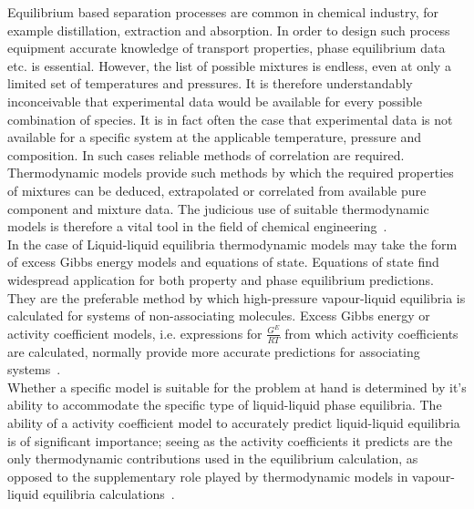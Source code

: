
Equilibrium based separation processes are common in chemical industry, for example distillation, extraction and absorption. In order to design such process equipment accurate knowledge of transport properties, phase equilibrium data etc. is essential. However, the list of possible mixtures is endless, even at only a limited set of temperatures and pressures. It is therefore understandably inconceivable that experimental data would be available for every possible combination of species. It is in fact often the case that experimental data is not available for a specific system at the applicable temperature, pressure and composition. In such cases reliable methods of correlation are required. Thermodynamic models provide such methods by which the required properties of mixtures can be deduced, extrapolated or correlated from available pure component and mixture data. The judicious use of suitable thermodynamic models is therefore a vital tool in the field of chemical engineering~\cite{SmithNessAbbott, GasLiquidProperties, ThermophysicalProperties}.\\

In the case of Liquid-liquid equilibria thermodynamic models may take the form of excess Gibbs energy models and equations of state. Equations of state find widespread application for both property and phase equilibrium predictions. They are the preferable method by which high-pressure vapour-liquid equilibria is calculated for systems of non-associating molecules. Excess Gibbs energy or activity coefficient models, i.e. expressions for $\frac{G^{E}}{RT}$ from which activity coefficients are calculated, normally provide more accurate predictions for associating systems~\cite{ThermophysicalProperties}.\\

Whether a specific model is suitable for the problem at hand is determined by it's ability to accommodate the specific type of liquid-liquid phase equilibria. The ability of a activity coefficient model to accurately predict liquid-liquid equilibria is of significant importance; seeing as the activity coefficients it predicts are the only thermodynamic contributions used in the equilibrium calculation, as opposed to the supplementary role played by thermodynamic models in vapour-liquid equilibria calculations~\cite{SmithNessAbbott, GasLiquidProperties}.\\

